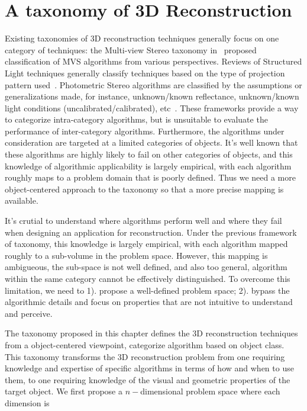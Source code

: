 
\chapter{A taxonomy of 3D Reconstruction}
\label{ch:3DRecon_Taxo}
Existing taxonomies of 3D reconstruction techniques generally focus on one category of techniques: the Multi-view Stereo taxonomy in~\cite{seitz2006comparison} proposed classification of MVS algorithms from various perspectives. Reviews of Structured Light techniques generally classify techniques based on the type of projection pattern used~\cite{geng2011structured, salvi2004pattern}. Photometric Stereo algorithms are classified by the assumptions or generalizations made, for instance, unknown/known reflectance, unknown/known light conditions (uncalibrated/calibrated), etc~\cite{shi2016benchmark}. These frameworks provide a way to categorize intra-category algorithms, but is unsuitable to evaluate the performance of inter-category algorithms. Furthermore, the algorithms under consideration are targeted at a limited categories of objects. It's well known that these algorithms are highly likely to fail on other categories of objects, and this knowledge of algorithmic applicability is largely empirical, with each algorithm roughly maps to a problem domain that is poorly defined. Thus we need a more object-centered approach to the taxonomy so that a more precise mapping is available.

It's crutial to understand where algorithms perform well and where they fail when designing an application for reconstruction. Under the previous framework of taxonomy, this knowledge is largely empirical, with each algorithm mapped roughly to a sub-volume in the problem space. However, this mapping is ambigueous, \ie the sub-space is not well defined, and also too general, \ie algorithm within the same category cannot be effectively distinguished. To overcome this limitation, we need to 1). propose a well-defined problem space; 2). bypass the algorithmic details and focus on properties that are not intuitive to understand and perceive.

The taxonomy proposed in this chapter defines the 3D reconstruction techniques from a object-centered viewpoint, \ie categorize algorithm based on object class. This taxonomy transforms the 3D reconstruction problem from one requiring knowledge and expertise of specific algorithms in terms of how and when to use them, to one requiring knowledge of the visual and geometric properties of the target object. We first propose a $n-$dimensional problem space where each dimension is 


